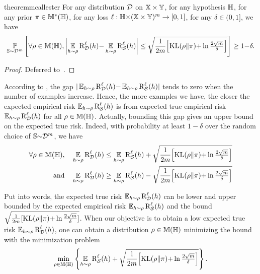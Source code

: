 \begin{restatable}{theorem}{mcallester}\label{chap:pac-bayes:theorem:mcallester}
For any distribution $\mathcal{D}$ on $\mathbb{X}\times\mathbb{Y}$, for any hypothesis $\mathbb{H}$, for any prior $\pi\in\mathbb{M}^{*}(\mathbb{H})$, for any loss $\ell: \mathbb{H}{\times}(\mathbb{X}\times\mathbb{Y})^m \to [0, 1]$, for any $\delta\in(0, 1]$, we have
\begin{align}
    \operatorname*{\mathbb{P}}_{\mathbb{S}\sim\mathcal{D}^m}\left[ \forall\rho\in\mathbb{M}(\mathbb{H}), \left\vert\operatorname*{\mathbb{E}}_{h\sim\rho}\text{R}^{\ell}_{\mathcal{D}}(h){-}\operatorname*{\mathbb{E}}_{h\sim\rho}\text{R}^{\ell}_{\mathcal{S}}(h)\right\vert \le \sqrt{\frac{1}{2m}\!\left[\operatorname{KL}(\rho\|\pi){+}\ln\tfrac{2\sqrt{m}}{\delta}\right]}\right] \ge 1{-}\delta.\label{chap:pac-bayes:eq:mcallester}
\end{align}
\end{restatable}
\begin{noaddcontents}\begin{proof}
Deferred to~.
\end{proof}\end{noaddcontents}

According to , the gap $|\operatorname*{\mathbb{E}}_{h\sim\rho}\text{R}^{\ell}_{\mathcal{D}}(h){-}\operatorname*{\mathbb{E}}_{h\sim\rho}\text{R}^{\ell}_{\mathcal{S}}(h)|$ tends to zero when the number of examples increase.
Hence, the more examples we have, the closer the expected empirical risk $\operatorname*{\mathbb{E}}_{h\sim\rho}\text{R}^{\ell}_{\mathcal{S}}(h)$  is from expected true empirical risk $\operatorname*{\mathbb{E}}_{h\sim\rho}\text{R}^{\ell}_{\mathcal{D}}(h)$ for all $\rho\in\mathbb{M}(\mathbb{H})$.
Actually, bounding this gap gives an upper bound on the expected true risk.
Indeed, with probability at least $1{-}\delta$ over the random choice of $\mathbb{S}{\sim}\mathcal{D}^m$, we have 
\begin{align}
    \forall\rho\in\mathbb{M}(\mathbb{H}),\quad &\operatorname*{\mathbb{E}}_{h\sim\rho}\text{R}^{\ell}_{\mathcal{D}}(h) \le \operatorname*{\mathbb{E}}_{h\sim\rho}\text{R}^{\ell}_{\mathcal{S}}(h) + \sqrt{\frac{1}{2m}\!\left[\operatorname{KL}(\rho\|\pi){+}\ln\tfrac{2\sqrt{m}}{\delta}\right]}\label{chap:pac-bayes:eq:mcallester-1}\\
    \text{and}\quad &\operatorname*{\mathbb{E}}_{h\sim\rho}\text{R}^{\ell}_{\mathcal{D}}(h) \ge \operatorname*{\mathbb{E}}_{h\sim\rho}\text{R}^{\ell}_{\mathcal{S}}(h) - \sqrt{\frac{1}{2m}\!\left[\operatorname{KL}(\rho\|\pi){+}\ln\tfrac{2\sqrt{m}}{\delta}\right]}\label{chap:pac-bayes:eq:mcallester-2}
\end{align}

Put into words, the expected true risk $\operatorname*{\mathbb{E}}_{h\sim\rho}\text{R}^{\ell}_{\mathcal{D}}(h)$ can be lower and upper bounded by the expected empirical risk $\operatorname*{\mathbb{E}}_{h\sim\rho}\text{R}^{\ell}_{\mathcal{S}}(h)$ and the bound $\sqrt{\frac{1}{2m}[\operatorname{KL}(\rho\|\pi){+}\ln\frac{2\sqrt{m}}{\delta}]}$.
When our objective is to obtain a low expected true risk $\operatorname*{\mathbb{E}}_{h\sim\rho}\text{R}^{\ell}_{\mathcal{D}}(h)$, one can obtain a distribution $\rho\in\mathbb{M}(\mathbb{H})$ minimizing the bound with the minimization problem 
\begin{align*}
    \min_{\rho\in\mathbb{M}(\mathbb{H})} \left\{ \operatorname*{\mathbb{E}}_{h\sim\rho}\text{R}^{\ell}_{\mathcal{S}}(h) + \sqrt{\frac{1}{2m}\!\left[\operatorname{KL}(\rho\|\pi){+}\ln\tfrac{2\sqrt{m}}{\delta}\right]} \right\}.
\end{align*}

